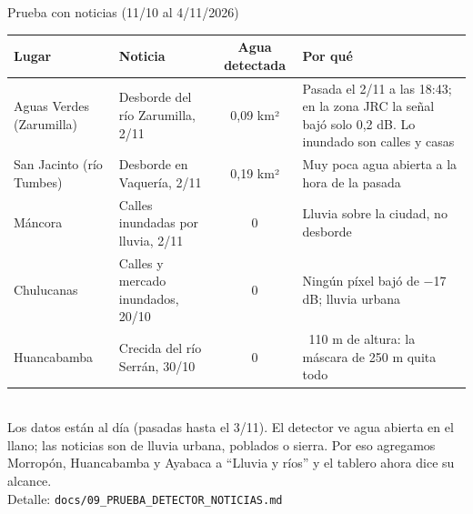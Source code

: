 \documentclass[aspectratio=169,11pt]{beamer}
\begin{document}
\begin{frame}{Prueba con noticias (11/10 al 4/11/2026)}
\scriptsize
\renewcommand{\arraystretch}{1.15}
\begin{tabularx}{\textwidth}{@{}>{\raggedright\arraybackslash}p{2.9cm} >{\raggedright\arraybackslash}p{3.6cm} c >{\raggedright\arraybackslash}X@{}}
\toprule
\textbf{Lugar} & \textbf{Noticia} & \textbf{Agua detectada} & \textbf{Por qué}\\
\midrule
Aguas Verdes (Zarumilla) & Desborde del río Zarumilla, 2/11 & 0,09 km² & Pasada el 2/11 a las 18:43; en la zona JRC la señal bajó solo 0,2 dB. Lo inundado son calles y casas\\
San Jacinto (río Tumbes) & Desborde en Vaquería, 2/11 & 0,19 km² & Muy poca agua abierta a la hora de la pasada\\
Máncora & Calles inundadas por lluvia, 2/11 & 0 & Lluvia sobre la ciudad, no desborde\\
Chulucanas & Calles y mercado inundados, 20/10 & 0 & Ningún píxel bajó de $-$17 dB; lluvia urbana\\
Huancabamba & Crecida del río Serrán, 30/10 & 0 & 2~110 m de altura: la máscara de 250 m quita todo\\
\bottomrule
\end{tabularx}\\[6pt]
\small Los datos están al día (pasadas hasta el 3/11). El detector ve agua abierta en el llano; las noticias son de lluvia urbana, poblados o sierra.
Por eso agregamos Morropón, Huancabamba y Ayabaca a ``Lluvia y ríos'' y el tablero ahora dice su alcance.\\[2pt]
\scriptsize Detalle: \texttt{docs/09\_PRUEBA\_DETECTOR\_NOTICIAS.md}
\end{frame}
\end{document}
